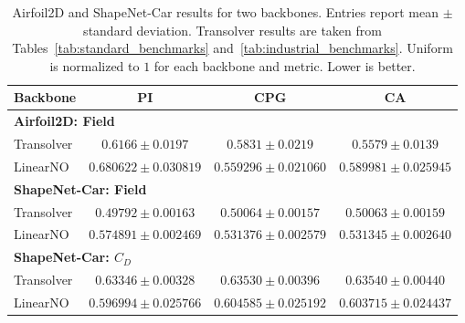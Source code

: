 \begin{table}[!htbp]
    \centering
    \small
    \caption{Airfoil2D and ShapeNet-Car results for two backbones. Entries
    report mean $\pm$ standard deviation. Transolver results are taken from
    Tables~\ref{tab:standard_benchmarks} and~\ref{tab:industrial_benchmarks}.
    Uniform is normalized to $1$ for each backbone and metric. Lower is better.}
    \label{tab:linearno_airfoil}
    \setlength{\tabcolsep}{3pt}
    \renewcommand{\arraystretch}{1.15}
    \begin{tabular*}{\textwidth}{@{\extracolsep{\fill}}lccc@{}}
        \toprule
        Backbone & PI & CPG & CA \\
        \midrule
        \multicolumn{4}{l}{\textbf{Airfoil2D: Field}} \\
        \addlinespace[2pt]
        Transolver & $0.6166\pm0.0197$
        & $0.5831\pm0.0219$ & $0.5579\pm0.0139$ \\
        \addlinespace[3pt]
        LinearNO & $0.680622\pm0.030819$
        & $0.559296\pm0.021060$ & $0.589981\pm0.025945$ \\
        \midrule
        \multicolumn{4}{l}{\textbf{ShapeNet-Car: Field}} \\
        \addlinespace[2pt]
        Transolver & $0.49792\pm0.00163$
        & $0.50064\pm0.00157$ & $0.50063\pm0.00159$ \\
        \addlinespace[3pt]
        LinearNO & $0.574891\pm0.002469$
        & $0.531376\pm0.002579$ & $0.531345\pm0.002640$ \\
        \midrule
        \multicolumn{4}{l}{\textbf{ShapeNet-Car: $C_D$}} \\
        \addlinespace[2pt]
        Transolver & $0.63346\pm0.00328$
        & $0.63530\pm0.00396$ & $0.63540\pm0.00440$ \\
        \addlinespace[3pt]
        LinearNO & $0.596994\pm0.025766$
        & $0.604585\pm0.025192$ & $0.603715\pm0.024437$ \\
        \bottomrule
    \end{tabular*}
\end{table}
